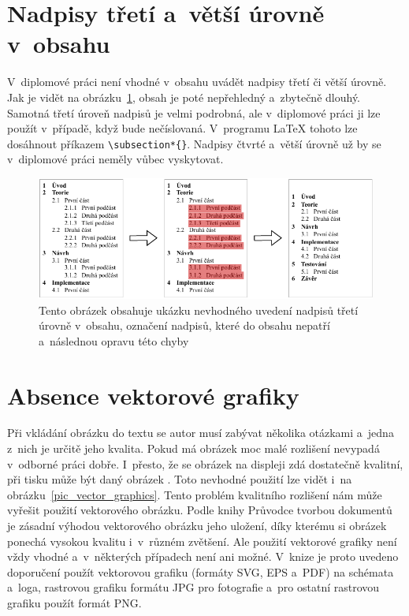 \section{Nadpisy třetí a~větší úrovně v~obsahu}
V~diplomové práci není vhodné v~obsahu uvádět nadpisy třetí či větší úrovně.
Jak je vidět na obrázku~\ref{pic_heading}, obsah je poté nepřehledný a~zbytečně
dlouhý. Samotná třetí úroveň nadpisů je velmi podrobná, ale v~diplomové práci
ji lze použít v~případě, když bude nečíslovaná. V~programu {\LaTeX} tohoto lze dosáhnout
příkazem \verb|\subsection*{}|. Nadpisy čtvrté a~větší úrovně už by se v~diplomové
práci neměly vůbec vyskytovat.

\begin{figure}[H]
    \centering
    \includegraphics[width=\linewidth]{obrazky-figures/heading_example.pdf}
    \caption{
        Tento obrázek obsahuje ukázku nevhodného uvedení nadpisů třetí
        úrovně v~obsahu, označení nadpisů, které do obsahu nepatří
        a~následnou opravu této chyby
    }
    \label{pic_heading}
\end{figure}


\section{Absence vektorové grafiky} \label{vector_graphic}
Při vkládání obrázku do textu se autor musí zabývat několika otázkami a~jedna
z~nich je určitě jeho kvalita. Pokud má obrázek moc malé rozlišení
nevypadá v~odborné práci dobře. I~přesto, že se obrázek na displeji zdá
dostatečně kvalitní, při tisku může být daný obrázek .
Toto nevhodné použití lze vidět i~na obrázku~\ref{pic_vector_graphics}.
Tento problém kvalitního rozlišení nám může vyřešit použití vektorového obrázku.
Podle knihy Průvodce tvorbou dokumentů~\cite[k.~10, s.~56--61]{Pruvodce_tvorbou_dokumentu} 
je zásadní výhodou vektorového
obrázku jeho uložení, díky kterému si obrázek ponechá vysokou kvalitu i~v~různém
zvětšení. Ale použití vektorové grafiky není vždy vhodné a~v~některých případech
není ani možné. V~knize je proto uvedeno doporučení použít vektorovou grafiku
(formáty SVG, EPS a~PDF) na schémata a~loga, rastrovou grafiku formátu JPG pro
fotografie a~pro ostatní rastrovou grafiku použít formát PNG.

